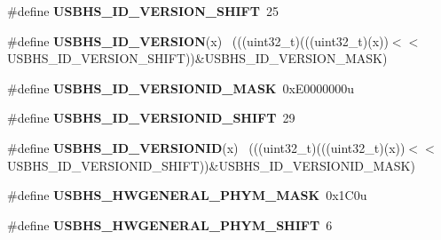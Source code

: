 \begin{DoxyCompactItemize}
\item 
\hypertarget{group___u_s_b_h_s___register___masks_ga9147578e784fad477a57a0048a1264ba}{}\#define {\bfseries U\+S\+B\+H\+S\+\_\+\+I\+D\+\_\+\+V\+E\+R\+S\+I\+O\+N\+\_\+\+S\+H\+I\+F\+T}~25\label{group___u_s_b_h_s___register___masks_ga9147578e784fad477a57a0048a1264ba}

\item 
\hypertarget{group___u_s_b_h_s___register___masks_gaf4d9637ed2b146dcd3b1b0b632fb866b}{}\#define {\bfseries U\+S\+B\+H\+S\+\_\+\+I\+D\+\_\+\+V\+E\+R\+S\+I\+O\+N}(x)                                        ~(((uint32\+\_\+t)(((uint32\+\_\+t)(x))$<$$<$U\+S\+B\+H\+S\+\_\+\+I\+D\+\_\+\+V\+E\+R\+S\+I\+O\+N\+\_\+\+S\+H\+I\+F\+T))\&U\+S\+B\+H\+S\+\_\+\+I\+D\+\_\+\+V\+E\+R\+S\+I\+O\+N\+\_\+\+M\+A\+S\+K)\label{group___u_s_b_h_s___register___masks_gaf4d9637ed2b146dcd3b1b0b632fb866b}

\item 
\hypertarget{group___u_s_b_h_s___register___masks_ga5d217fcf4c4686b61bbea657f52f3d12}{}\#define {\bfseries U\+S\+B\+H\+S\+\_\+\+I\+D\+\_\+\+V\+E\+R\+S\+I\+O\+N\+I\+D\+\_\+\+M\+A\+S\+K}~0x\+E0000000u\label{group___u_s_b_h_s___register___masks_ga5d217fcf4c4686b61bbea657f52f3d12}

\item 
\hypertarget{group___u_s_b_h_s___register___masks_ga19912255912acff8c7d3187c29a21a62}{}\#define {\bfseries U\+S\+B\+H\+S\+\_\+\+I\+D\+\_\+\+V\+E\+R\+S\+I\+O\+N\+I\+D\+\_\+\+S\+H\+I\+F\+T}~29\label{group___u_s_b_h_s___register___masks_ga19912255912acff8c7d3187c29a21a62}

\item 
\hypertarget{group___u_s_b_h_s___register___masks_ga48468ca0d8c77d6d71592499b53e20b1}{}\#define {\bfseries U\+S\+B\+H\+S\+\_\+\+I\+D\+\_\+\+V\+E\+R\+S\+I\+O\+N\+I\+D}(x)                                    ~(((uint32\+\_\+t)(((uint32\+\_\+t)(x))$<$$<$U\+S\+B\+H\+S\+\_\+\+I\+D\+\_\+\+V\+E\+R\+S\+I\+O\+N\+I\+D\+\_\+\+S\+H\+I\+F\+T))\&U\+S\+B\+H\+S\+\_\+\+I\+D\+\_\+\+V\+E\+R\+S\+I\+O\+N\+I\+D\+\_\+\+M\+A\+S\+K)\label{group___u_s_b_h_s___register___masks_ga48468ca0d8c77d6d71592499b53e20b1}

\item 
\hypertarget{group___u_s_b_h_s___register___masks_gac260154dd315d0bc3ba7fdad2c3a9c10}{}\#define {\bfseries U\+S\+B\+H\+S\+\_\+\+H\+W\+G\+E\+N\+E\+R\+A\+L\+\_\+\+P\+H\+Y\+M\+\_\+\+M\+A\+S\+K}~0x1\+C0u\label{group___u_s_b_h_s___register___masks_gac260154dd315d0bc3ba7fdad2c3a9c10}

\item 
\hypertarget{group___u_s_b_h_s___register___masks_ga1434559b309b90aa9e2beeb1ab709b9f}{}\#define {\bfseries U\+S\+B\+H\+S\+\_\+\+H\+W\+G\+E\+N\+E\+R\+A\+L\+\_\+\+P\+H\+Y\+M\+\_\+\+S\+H\+I\+F\+T}~6\label{group___u_s_b_h_s___register___masks_ga1434559b309b90aa9e2beeb1ab709b9f}


\end{DoxyCompactItemize}

